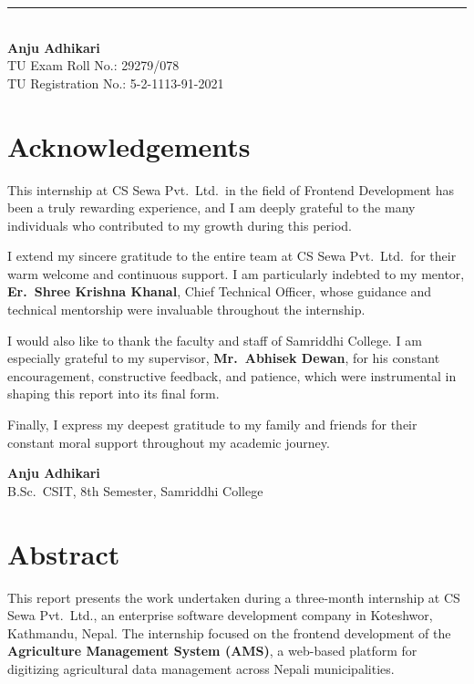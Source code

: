 \documentclass[12pt,a4paper]{report}
\begin{document}
\vspace{2.5cm}
\noindent\rule{5cm}{0.4pt}\\[4pt]
\textbf{Anju Adhikari}\\
TU Exam Roll No.: 29279/078\\
TU Registration No.: 5-2-1113-91-2021

\newpage
\chapter*{Acknowledgements}

This internship at CS Sewa Pvt.\ Ltd.\ in the field of Frontend Development has been a
truly rewarding experience, and I am deeply grateful to the many individuals who
contributed to my growth during this period.

I extend my sincere gratitude to the entire team at CS Sewa Pvt.\ Ltd.\ for their warm
welcome and continuous support. I am particularly indebted to my mentor,
\textbf{Er.\ Shree Krishna Khanal}, Chief Technical Officer, whose guidance and technical
mentorship were invaluable throughout the internship.

I would also like to thank the faculty and staff of Samriddhi College. I am especially grateful
to my supervisor, \textbf{Mr.\ Abhisek Dewan}, for his constant encouragement, constructive
feedback, and patience, which were instrumental in shaping this report into its final form.

Finally, I express my deepest gratitude to my family and friends for their constant moral
support throughout my academic journey.

\vspace{0.5cm}
\noindent\textbf{Anju Adhikari}\\
B.Sc.\ CSIT, 8th Semester, Samriddhi College

\newpage
\chapter*{Abstract}

This report presents the work undertaken during a three-month internship at CS Sewa
Pvt.\ Ltd., an enterprise software development company in Koteshwor, Kathmandu, Nepal.
The internship focused on the frontend development of the \textbf{Agriculture Management
System (AMS)}, a web-based platform for digitizing agricultural data management across
Nepali municipalities.
\end{document}
